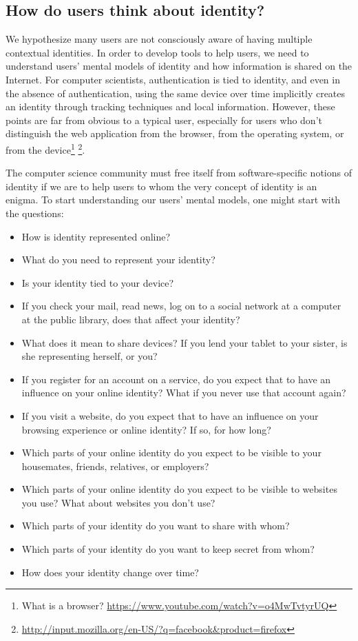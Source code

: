 \documentclass[10pt, conference, compsocconf]{IEEEtran}
\begin{document}
\subsection{How do users think about identity?}
We hypothesize many users are not consciously aware of having multiple
contextual identities. In order to develop tools to help users, we need to
understand users' mental models of identity and how information is shared on
the Internet. For computer scientists, authentication is tied to identity, and
even in the absence of authentication, using the same device over time
implicitly creates an identity through tracking techniques and local
information. However, these points are far from obvious to a typical user,
especially for users who don't distinguish the web application from the
browser, from the operating system, or from the device\footnote{What is a browser? \url{https://www.youtube.com/watch?v=o4MwTvtyrUQ}} \footnote{\url{http://input.mozilla.org/en-US/?q=facebook&product=firefox}}.

The computer science community must free itself from software-specific
notions of identity if we are to help users to whom the very concept of
identity is an enigma. To start understanding our users' mental models,
one might start with the questions:

\begin{itemize}
\item How is identity represented online?
\item What do you need to represent your identity?
\item Is your identity tied to your device?
\item If you check your mail, read news, log on to a social network at a
computer at the public library, does that affect your identity?
\item What does it mean to share devices? If you lend your tablet to your
sister, is she representing herself, or you?
\item If you register for an account on a service, do you expect that to have
an influence on your online identity? What if you never use that account again?
\item If you visit a website, do you expect that to have an influence on your
browsing experience or online identity? If so, for how long?
\item Which parts of your online identity do you expect to be visible to
your housemates, friends, relatives, or employers?
\item Which parts of your online identity do you expect to be visible to
websites you use? What about websites you don't use?
\item Which parts of your identity do you want to share with whom?
\item Which parts of your identity do you want to keep secret from whom?
\item How does your identity change over time?
\end{itemize}
\end{document}
